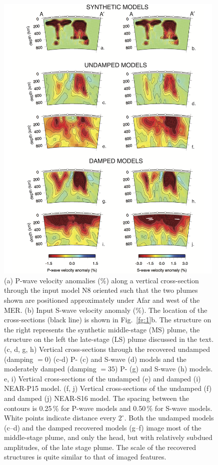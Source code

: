 \documentclass[a4paper,10pt,twocolumn]{paper}
\begin{document}
\begin{figure}
\centering
\includegraphics[width=11cm]{../figures-working/fig07.png}
\caption{(a) P-wave velocity anomalies (\%) along a vertical cross-section through the input model N8 oriented such that the two plumes shown are positioned approximately under Afar and west of the MER. (b) Input S-wave velocity anomaly (\%). The location of the cross-sections (black line) is shown in Fig.~\ref{fg:1}b. The structure on the right represents the synthetic middle-stage (MS) plume, the structure on the left the late-stage (LS) plume discussed in the text. (c, d, g, h) Vertical cross-sections through the recovered undamped (damping $=0$) (c-d) P- (c) and S-wave (d) models and the moderately damped (damping $=35$) P- (g) and S-wave (h) models. e, i) Vertical cross-sections of the undamped (e) and damped (i) NEAR-P15 model. (f, j) Vertical cross-sections of the undamped (f) and damped (j) NEAR-S16 model. The spacing between the contours is 0.25\,\% for P-wave models and 0.50\,\% for S-wave models. White points indicate distance every $2^{\circ}$. Both the undamped models (c–d) and the damped recovered models (g–f) image most of the middle-stage plume, and only the head, but with relatively subdued amplitudes, of the late stage plume. The scale of the recovered structures is quite similar to that of imaged features.}
\label{fg:7}
\end{figure}
\end{document}
